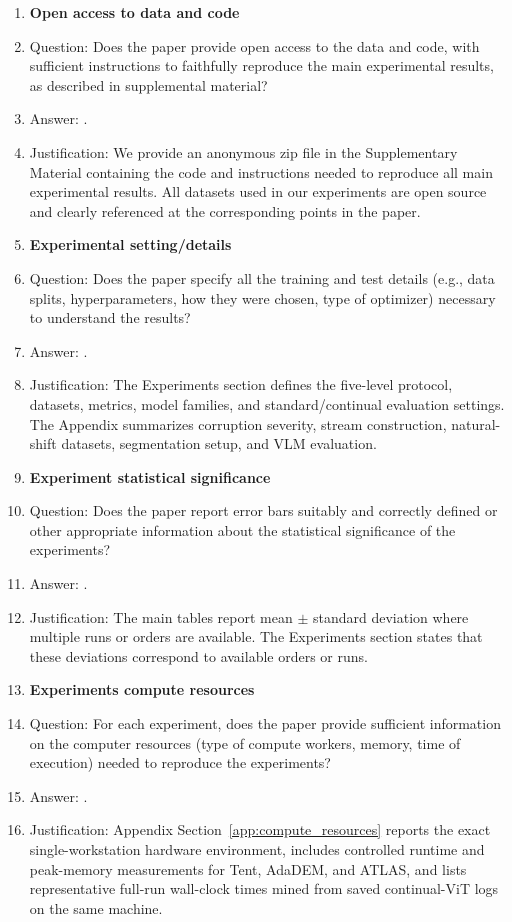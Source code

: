 \begin{enumerate}
\item {\bf Open access to data and code}
    \item[] Question: Does the paper provide open access to the data and code, with sufficient instructions to faithfully reproduce the main experimental results, as described in supplemental material?
    \item[] Answer: \answerYes{}.
    \item[] Justification: We provide an anonymous zip file in the Supplementary Material containing the
code and instructions needed to reproduce all main experimental results. All datasets used
in our experiments are open source and clearly referenced at the corresponding points in the
paper.

\item {\bf Experimental setting/details}
    \item[] Question: Does the paper specify all the training and test details (e.g., data splits, hyperparameters, how they were chosen, type of optimizer) necessary to understand the results?
    \item[] Answer: \answerYes{}.
    \item[] Justification: The Experiments section defines the five-level protocol, datasets, metrics, model families, and standard/continual evaluation settings. The Appendix summarizes corruption severity, stream construction, natural-shift datasets, segmentation setup, and VLM evaluation.

\item {\bf Experiment statistical significance}
    \item[] Question: Does the paper report error bars suitably and correctly defined or other appropriate information about the statistical significance of the experiments?
    \item[] Answer: \answerYes{}.
    \item[] Justification: The main tables report mean $\pm$ standard deviation where multiple runs or orders are available. The Experiments section states that these deviations correspond to available orders or runs.

\item {\bf Experiments compute resources}
    \item[] Question: For each experiment, does the paper provide sufficient information on the computer resources (type of compute workers, memory, time of execution) needed to reproduce the experiments?
    \item[] Answer: \answerYes{}.
    \item[] Justification: Appendix Section~\ref{app:compute_resources} reports the exact single-workstation hardware environment, includes controlled runtime and peak-memory measurements for Tent, AdaDEM, and ATLAS, and lists representative full-run wall-clock times mined from saved continual-ViT logs on the same machine.


\end{enumerate}
